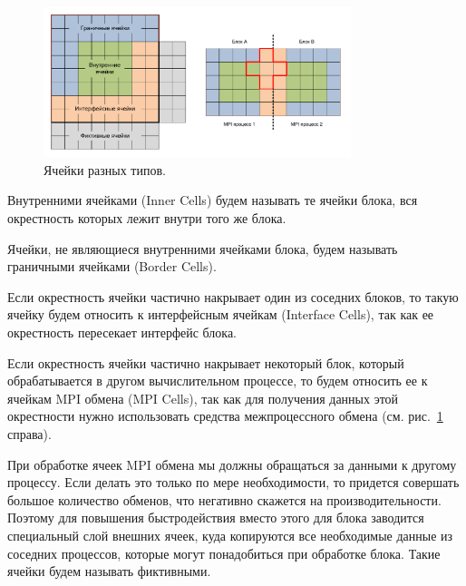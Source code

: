 \begin{figure}[ht]
\centering
\includegraphics[width=0.8\textwidth]{fig/par_4-block-cells.pdf}
\singlespacing
{}\caption{Ячейки разных типов.}
\label{fig:text_2_block_block_cells}
\end{figure}

\begin{definition}
Внутренними ячейками (Inner Cells) будем называть те ячейки блока, вся окрестность которых лежит внутри того же блока.
\end{definition}

\begin{definition}
Ячейки, не являющиеся внутренними ячейками блока, будем называть граничными ячейками (Border Cells).
\end{definition}

\begin{definition}
Если окрестность ячейки частично накрывает один из соседних блоков, то такую ячейку будем относить к интерфейсным ячейкам (Interface Cells), так как ее окрестность пересекает интерфейс блока.
\end{definition}

\begin{definition}
Если окрестность ячейки частично накрывает некоторый блок, который обрабатывается в другом вычислительном процессе, то будем относить ее к ячейкам MPI обмена (MPI Cells), так как для получения данных этой окрестности нужно использовать средства межпроцессного обмена (см. рис.~\ref{fig:text_2_block_block_cells} справа).
\end{definition}

При обработке ячеек MPI обмена мы должны обращаться за данными к другому процессу.
Если делать это только по мере необходимости, то придется совершать большое количество обменов, что негативно скажется на производительности.
Поэтому для повышения быстродействия вместо этого для блока заводится специальный слой внешних ячеек, куда копируются все необходимые данные из соседних процессов, которые могут понадобиться при обработке блока.
Такие ячейки будем называть фиктивными.

